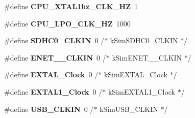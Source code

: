 \begin{DoxyCompactItemize}
\item 
\#define {\bfseries C\+P\+U\+\_\+\+X\+T\+A\+L1hz\+\_\+\+C\+L\+K\+\_\+\+HZ}~1\hypertarget{group__clock__manager_ga935674b004e4ad2c3ef4aa1903641a2a}{}\label{group__clock__manager_ga935674b004e4ad2c3ef4aa1903641a2a}

\item 
\#define {\bfseries C\+P\+U\+\_\+\+L\+P\+O\+\_\+\+C\+L\+K\+\_\+\+HZ}~1000\hypertarget{group__clock__manager_gaa03c6cb542b990b6c6928b1001db0ed8}{}\label{group__clock__manager_gaa03c6cb542b990b6c6928b1001db0ed8}

\item 
\#define {\bfseries S\+D\+H\+C0\+\_\+\+C\+L\+K\+IN}~0   /$\ast$ k\+Sim\+S\+D\+H\+C0\+\_\+\+C\+L\+K\+IN $\ast$/\hypertarget{group__clock__manager_ga05b71b6695ef23c01e5def32dc5b6513}{}\label{group__clock__manager_ga05b71b6695ef23c01e5def32dc5b6513}

\item 
\#define {\bfseries E\+N\+E\+T\+\_\+\_\+\+C\+L\+K\+IN}~0   /$\ast$ k\+Sim\+E\+N\+E\+T\+\_\+\_\+\+C\+L\+K\+IN $\ast$/\hypertarget{group__clock__manager_ga8be014f9e7bddce93a3964d2f31f2a16}{}\label{group__clock__manager_ga8be014f9e7bddce93a3964d2f31f2a16}

\item 
\#define {\bfseries E\+X\+T\+A\+L\+\_\+\+Clock}~0   /$\ast$ k\+Sim\+E\+X\+T\+A\+L\+\_\+\+Clock $\ast$/\hypertarget{group__clock__manager_gad9219492152b1e5dd9e991bd549147f4}{}\label{group__clock__manager_gad9219492152b1e5dd9e991bd549147f4}

\item 
\#define {\bfseries E\+X\+T\+A\+L1\+\_\+\+Clock}~0   /$\ast$ k\+Sim\+E\+X\+T\+A\+L1\+\_\+\+Clock $\ast$/\hypertarget{group__clock__manager_ga55b6577078950b22f768036201f0b96f}{}\label{group__clock__manager_ga55b6577078950b22f768036201f0b96f}

\item 
\#define {\bfseries U\+S\+B\+\_\+\+C\+L\+K\+IN}~0   /$\ast$ k\+Sim\+U\+S\+B\+\_\+\+C\+L\+K\+IN $\ast$/\hypertarget{group__clock__manager_ga97b10e2107415c3be0df8761d955cc3f}{}\label{group__clock__manager_ga97b10e2107415c3be0df8761d955cc3f}

\end{DoxyCompactItemize}
